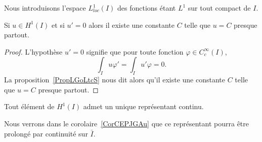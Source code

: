 Nous introduisons l'espace \( L^1_{loc}(I)\) des fonctions étant \( L^1\) sur tout compact de \( I\).

\begin{corollary}   \label{CorEVJYihj}
    Si \( u\in H^1(I)\) et si \( u'=0\) alors il existe une constante \( C\) telle que \( u=C\) presque partout.
\end{corollary}

\begin{proof}
    L'hypothèse \( u'=0\) signifie que pour toute fonction \( \varphi\in C^{\infty}_c(I)\),
    \begin{equation}
        \int_Iu\varphi'=\int_Iu'\varphi=0.
    \end{equation}
    La proposition~\ref{PropLGoLtcS} nous dit alors qu'il existe une constante \( C\) telle que \( u=C\) presque partout.
\end{proof}

\begin{lemma}   \label{LemMPkbZxX}
    Tout élément de \( H^1(I)\) admet un unique représentant continu.
\end{lemma}
Nous verrons dans le corolaire~\ref{CorCEPJGAu} que ce représentant pourra être prolongé par continuité sur \( \bar I\).

